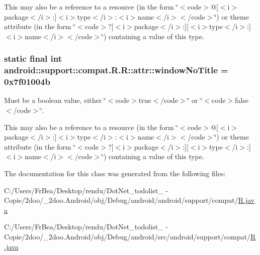 This may also be a reference to a resource (in the form \char`\"{}$<$code$>$@\mbox{[}$<$i$>$package$<$/i$>$:\mbox{]}$<$i$>$type$<$/i$>$:$<$i$>$name$<$/i$>$$<$/code$>$\char`\"{}) or theme attribute (in the form \char`\"{}$<$code$>$?\mbox{[}$<$i$>$package$<$/i$>$:\mbox{]}\mbox{[}$<$i$>$type$<$/i$>$:\mbox{]}$<$i$>$name$<$/i$>$$<$/code$>$\char`\"{}) containing a value of this type. \hypertarget{classandroid_1_1support_1_1compat_1_1_r_1_1attr_5e474d0d0e901acc2446b9998ae437f2}{
\subsubsection[{windowNoTitle}]{\setlength{\rightskip}{0pt plus 5cm}static final int android::support::compat.R.R::attr::windowNoTitle = 0x7f01004b}}
\label{classandroid_1_1support_1_1compat_1_1_r_1_1attr_5e474d0d0e901acc2446b9998ae437f2}


Must be a boolean value, either \char`\"{}$<$code$>$true$<$/code$>$\char`\"{} or \char`\"{}$<$code$>$false$<$/code$>$\char`\"{}. 

This may also be a reference to a resource (in the form \char`\"{}$<$code$>$@\mbox{[}$<$i$>$package$<$/i$>$:\mbox{]}$<$i$>$type$<$/i$>$:$<$i$>$name$<$/i$>$$<$/code$>$\char`\"{}) or theme attribute (in the form \char`\"{}$<$code$>$?\mbox{[}$<$i$>$package$<$/i$>$:\mbox{]}\mbox{[}$<$i$>$type$<$/i$>$:\mbox{]}$<$i$>$name$<$/i$>$$<$/code$>$\char`\"{}) containing a value of this type. 

The documentation for this class was generated from the following files:\begin{CompactItemize}
\item 
C:/Users/FrBea/Desktop/rendu/DotNet\_\-todolist\_ - Copie/2doo/\_\-2doo.Android/obj/Debug/android/android/support/compat/\hyperlink{android_2support_2compat_2_r_8java}{R.java}\item 
C:/Users/FrBea/Desktop/rendu/DotNet\_\-todolist\_ - Copie/2doo/\_\-2doo.Android/obj/Debug/android/src/android/support/compat/\hyperlink{src_2android_2support_2compat_2_r_8java}{R.java}\end{CompactItemize}
